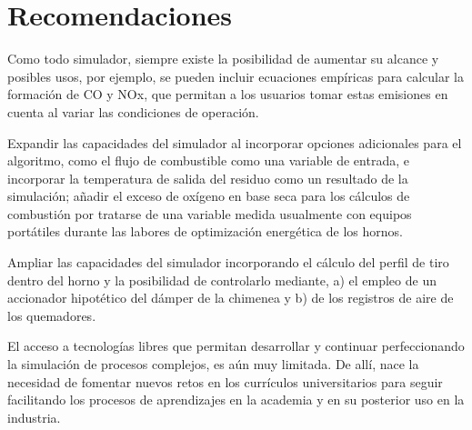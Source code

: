 \chapter*{Recomendaciones}

    \par Como todo simulador, siempre existe la posibilidad de aumentar su alcance y posibles usos, por ejemplo, se pueden incluir ecuaciones empíricas para calcular la formación de CO y NOx, que permitan a los usuarios tomar estas emisiones en cuenta al variar las condiciones de operación.
    
    \par Expandir las capacidades del simulador al incorporar opciones adicionales para el algoritmo, como el flujo de combustible como una variable de entrada, e incorporar la temperatura de salida del residuo como un resultado de la simulación; añadir el exceso de oxígeno en base seca para los cálculos de combustión por tratarse de una variable medida usualmente con equipos portátiles durante las labores de optimización energética de los hornos.
    
    \par Ampliar las capacidades del simulador incorporando el cálculo del perfil de tiro dentro del horno y la posibilidad de controlarlo mediante, a) el empleo de un accionador hipotético del dámper de la chimenea y b) de los registros de aire de los quemadores.

    \par El acceso a tecnologías libres que permitan desarrollar y continuar perfeccionando la simulación de procesos complejos, es aún muy limitada. De allí, nace la necesidad de fomentar nuevos retos en los currículos universitarios para seguir facilitando los procesos de aprendizajes en la academia y en su posterior uso en la industria.
